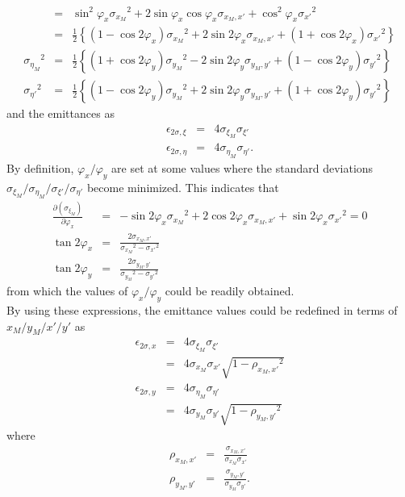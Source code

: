 \documentclass{article}
\begin{document}
\begin{eqnarray*}
& = & \sin^2{\varphi_x} {\sigma_{x_M}}^2 +2\sin{\varphi_x}\cos{\varphi_x} \sigma_{x_M,x'} + \cos^2{\varphi_x} {\sigma_{x'}}^2 \\
& = & \frac{1}{2} \left\{ \left(1-\cos{2\varphi_x}\right) {\sigma_{x_M}}^2 + 2\sin{2\varphi_x}\sigma_{x_M,x'} + \left(1+\cos{2\varphi_x}\right) {\sigma_{x'}}^2 \right\} \\
{\sigma_{\eta_M}}^2 & = & \frac{1}{2} \left\{ \left(1+\cos{2\varphi_y}\right) {\sigma_{y_M}}^2 - 2\sin{2\varphi_y}\sigma_{y_M,y'} + \left(1-\cos{2\varphi_y}\right) {\sigma_{y'}}^2 \right\} \\
{\sigma_{\eta'}}^2 & = & \frac{1}{2} \left\{ \left(1-\cos{2\varphi_y}\right) {\sigma_{y_M}}^2 + 2\sin{2\varphi_y}\sigma_{y_M,y'} + \left(1+\cos{2\varphi_y}\right) {\sigma_{y'}}^2 \right\}
\end{eqnarray*}
and the emittances as
\begin{eqnarray*}
\epsilon_{2\sigma,\xi} & = & 4\sigma_{\xi_M}\sigma_{\xi'} \\
\epsilon_{2\sigma,\eta} & = & 4\sigma_{\eta_M}\sigma_{\eta'}.
\end{eqnarray*}
By definition, $\varphi_x/\varphi_y$ are set at some values where the standard deviations $\sigma_{\xi_M}/\sigma_{\eta_M}/\sigma_{\xi'}/\sigma_{\eta'}$ become minimized. This indicates that
\begin{eqnarray*}
\frac{\partial \left({\sigma_{\xi_M}}\right)}{\partial \varphi_x} & = & -\sin{2\varphi_x}{\sigma_{x_M}}^2  + 2\cos{2\varphi_x}\sigma_{x_M,x'} + \sin{2\varphi_x}{\sigma_{x'}}^2 = 0 \\
\tan{2\varphi_x} & = & \frac{2\sigma_{x_M,x'}}{{\sigma_{x_M}}^2 - {\sigma_{x'}}^2} \\
\tan{2\varphi_y} & = & \frac{2\sigma_{y_M,y'}}{{\sigma_{y_M}}^2 - {\sigma_{y'}}^2}
\end{eqnarray*}
from which the values of $\varphi_x/\varphi_y$ could be readily obtained.\\

By using these expressions, the emittance values could be redefined in terms of $x_M/y_M/x'/y'$ as
\begin{eqnarray*}
\epsilon_{2\sigma,x} & = & 4\sigma_{\xi_M}\sigma_{\xi'} \\
& = & 4\sigma_{x_M}\sigma_{x'} \sqrt{1 - {\rho_{x_M,x'}}^2} \\
\epsilon_{2\sigma,y} & = & 4\sigma_{\eta_M}\sigma_{\eta'} \\
& = & 4\sigma_{y_M}\sigma_{y'} \sqrt{1 - {\rho_{y_M,y'}}^2}
\end{eqnarray*}
where
\begin{eqnarray*}
\rho_{x_M,x'} & = & \frac{\sigma_{x_M,x'}}{\sigma_{x_M}\sigma_{x'}} \\
\rho_{y_M,y'} & = & \frac{\sigma_{y_M,y'}}{\sigma_{y_M}\sigma_{y'}} .
\end{eqnarray*}
\end{document}
